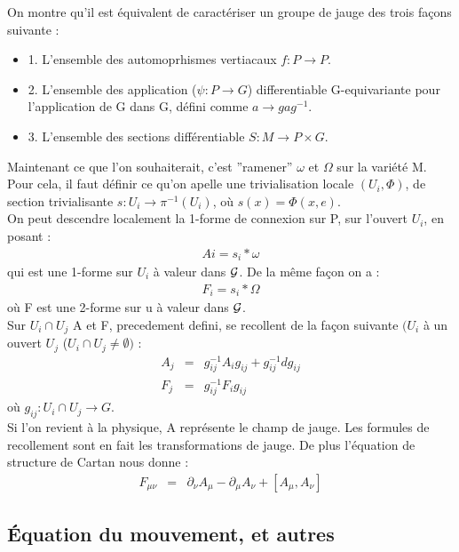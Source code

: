 \documentclass[a4paper,11pt]{article}
\theoremstyle{plain}
\theoremstyle{definition}
\theoremstyle{remark}
\numberwithin{equation}{section}
\numberwithin{equation}{subsection}
\numberwithin{figure}{section}
\begin{document}
On montre qu'il est équivalent de caractériser un groupe de jauge des trois façons suivante :
\begin{itemize}
 \renewcommand{\labelitemi}{$\bullet$}
 \item 1. L'ensemble des automoprhismes vertiacaux $ f: P \to P$.
 \item 2. L'ensemble des application ($\psi : P \to G$) differentiable G-equivariante pour l'application de G dans G, défini comme $a \to g a g^{-1}$.
 \item 3. L'ensemble des sections différentiable $S : M \to P \times G$.
\end{itemize}

\noindent
Maintenant ce que l'on souhaiterait, c'est ''ramener'' $\omega$ et $\Omega$ sur la variété M. Pour cela, il faut définir ce qu'on apelle une 
trivialisation locale $(U_{i}, \Phi)$, de section trivialisante $s: U_{i} \rightarrow \pi^{-1} (U_{i})$, où $s(x) = \Phi (x,e)$. \\
On peut descendre localement la 1-forme de connexion sur P, sur l'ouvert $U_{i}$, en posant :
\begin{eqnarray}
 A{i} = s_{i}*\omega
\end{eqnarray}
qui est une 1-forme sur $U_{i}$ à valeur dans $\cal{G}$.
De la même façon on a :
\begin{eqnarray}
 F_{i} = s_{i}*\Omega
\end{eqnarray}
où F est une 2-forme sur u à valeur dans $\cal{G}$. \\
Sur $U_{i} \cap U_{j}$ A et F, precedement defini, se recollent de la façon suivante $(U_{i}$ à 
un ouvert $U_{j}$ ($U_{i} \cap U_{j} \ne \emptyset )$ :
\begin{eqnarray}
 A_{j} &=& g^{-1}_{ij} A_{i} g_{ij} + g^{-1}_{ij} d g_{ij} \\
 F_{j} &=& g^{-1}_{ij} F_{i} g_{ij} 
\end{eqnarray}
où $g_{ij} : U_{i} \cap U_{j}  \to  G$.\\
Si l'on revient à la physique, A représente le champ de jauge. Les formules de recollement sont en fait les transformations de jauge. De plus 
l'équation de structure de Cartan nous donne :
\begin{eqnarray}
 F_{\mu \nu} &=&  \partial_{\nu}A_{\mu} - \partial_{\mu}A_{\nu} + [A_{\mu},A_{\nu}]
\end{eqnarray}

\subsection{Équation du mouvement, et autres}
\end{document}
